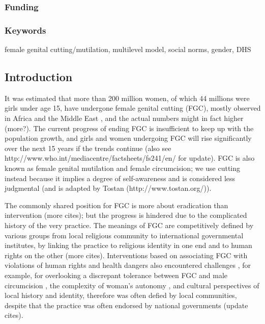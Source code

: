 \documentclass[12pt,]{article}
\begin{document}
\subsubsection{Funding}\label{funding}

\subsubsection{Keywords}\label{keywords}

female genital cutting/mutilation, multilevel model, social norms, gender, DHS

\subsection{Introduction}\label{introduction}

It was estimated that more than 200 million women, of which 44 millions were girls under age 15, have undergone female genital cutting (FGC), mostly observed in Africa and the Middle East \cite{UNFPA14, UNIC16}, and the actual numbers might in fact higher \cite{GaluKama15} (more?).  The current progress of ending FGC is insufficient to keep up with the population growth, and girls and women undergoing FGC will rise significantly over the next 15 years if the trends continue \cite{UNIC16} (also see http://www.who.int/mediacentre/factsheets/fs241/en/ for update).  FGC is also known as female genital mutilation and female circumcision; we use cutting instead because it implies a degree of self-awareness and is considered less judgmental \cite{KhahBark09, JohnEsse10, Meye00, Shel01} (and is adapted by Tostan (http://www.tostan.org/)).

The commonly shared position for FGC is more about eradication than intervention \cite{Toub94, Mack96, UNIC16} (more cites); but the progress is hindered due to the complicated history of the very practice.  The meanings of FGC are competitively defined by various groups from local religious community to international governmental institutes, by linking the practice to religious identity in one end and to human rights on the other \cite{Boyl02, SchuLien13, WHO12} (more cites).  Interventions based on associating FGC with violations of human rights and health dangers also encountered challenges \cite{MuthSvan15}, for example, for overlooking a discrepant tolerance between FGC and male circumcision \cite{DarbSvob07, JohnEsse10}, the complexity of woman's autonomy \cite{Meye00}, and cultural perspectives of local history and identity, therefore was often defied by local communities, despite that the practice was often endorsed by national governments \cite{Boyl02, BoylMcMo02, BoylCarb10, Grue05, Koom14, PerrSeni13, Shel08, ShelWand13, Wade11} (update cites). 
\end{document}
